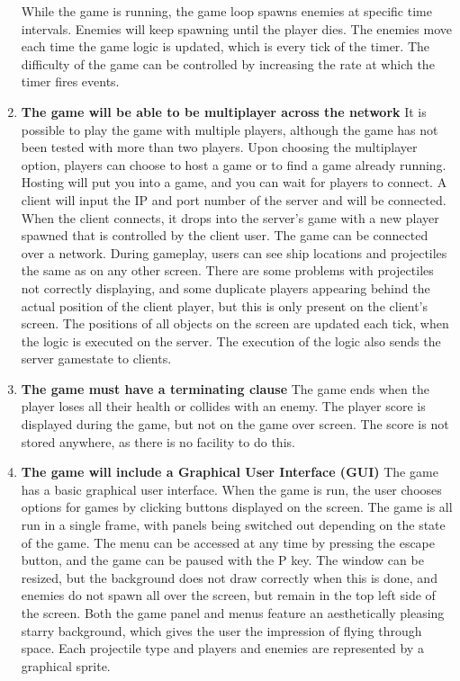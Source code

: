 \begin{enumerate}
While the game is running, the game loop spawns enemies at specific time intervals. Enemies will keep spawning until the player dies. The enemies move each time the game logic is updated, which is every tick of the timer. The difficulty of the game can be controlled by increasing the rate at which the timer fires events.
\item \textbf{The game will be able to be multiplayer across the network}
It is possible to play the game with multiple players, although the game has not been tested with more than two players. Upon choosing the multiplayer option, players can choose to host a game or to find a game already running. Hosting will put you into a game, and you can wait for players to connect. A client will input the IP and port number of the server and will be connected. When the client connects, it drops into the server's game with a new player spawned that is controlled by the client user. The game can be connected over a network. During gameplay, users can see ship locations and projectiles the same as on any other screen. There are some problems with projectiles not correctly displaying, and some duplicate players appearing behind the actual position of the client player, but this is only present on the client's screen. The positions of all objects on the screen are updated each tick, when the logic is executed on the server. The execution of the logic also sends the server gamestate to clients.
\item \textbf{The game must have a terminating clause}
The game ends when the player loses all their health or collides with an enemy. The player score is displayed during the game, but not on the game over screen. The score is not stored anywhere, as there is no facility to do this.
\item \textbf{The game will include a Graphical User Interface (GUI)}
The game has a basic graphical user interface. When the game is run, the user chooses options for games by clicking buttons displayed on the screen. The game is all run in a single frame, with panels being switched out depending on the state of the game. The menu can be accessed at any time by pressing the escape button, and the game can be paused with the P key. The window can be resized, but the background does not draw correctly when this is done, and enemies do not spawn all over the screen, but remain in the top left side of the screen. Both the game panel and menus feature an aesthetically pleasing starry background, which gives the user the impression of flying through space. Each projectile type and players and enemies are represented by a graphical sprite.
\end{enumerate}